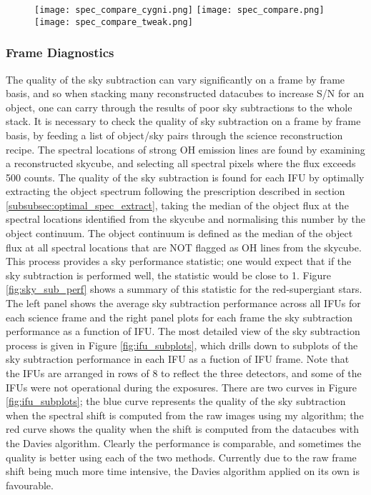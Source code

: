 \documentclass{literature}
\begin{document}
\begin{figure}[!htp]
\centering
\texttt{[image: spec\_compare\_cygni.png]}
\texttt{[image: spec\_compare.png]}
\texttt{[image: spec\_compare\_tweak.png]}
\caption{\footnotesize{\emph{}}}
\label{fig:p_cygni}
\end{figure}

\subsubsection{Frame Diagnostics}\label{frame_diagnostics}
The quality of the sky subtraction can vary significantly on a frame by frame basis, and so when stacking many reconstructed datacubes to increase S/N for an object, one can carry through the results of poor sky subtractions to the whole stack. It is necessary to check the quality of sky subtraction on a frame by frame basis, by feeding a list of object/sky pairs through the science reconstruction recipe. The spectral locations of strong OH emission lines are found by examining a reconstructed skycube, and selecting all spectral pixels where the flux exceeds 500 counts. The quality of the sky subtraction is found for each IFU by optimally extracting the object spectrum following the prescription described in section \ref{subsubsec:optimal_spec_extract}, taking the median of the object flux at the spectral locations identified from the skycube and normalising this number by the object continuum. The object continuum is defined as the median of the object flux at all spectral locations that are NOT flagged as OH lines from the skycube. This process provides a sky performance statistic; one would expect that if the sky subtraction is performed well, the statistic would be close to 1. Figure \ref{fig:sky_sub_perf} shows a summary of this statistic for the red-supergiant stars. The left panel shows the average sky subtraction performance across all IFUs for each science frame and the right panel plots for each frame the sky subtraction performance as a function of IFU. The most detailed view of the sky subtraction process is given in Figure \ref{fig:ifu_subplots}, which drills down to subplots of the sky subtraction performance in each IFU as a fuction of IFU frame. Note that the IFUs are arranged in rows of 8 to reflect the three detectors, and some of the IFUs were not operational during the exposures. There are two curves in Figure \ref{fig:ifu_subplots}; the blue curve represents the quality of the sky subtraction when the spectral shift is computed from the raw images using my algorithm; the red curve shows the quality when the shift is computed from the datacubes with the Davies algorithm. Clearly the performance is comparable, and sometimes the quality is better using each of the two methods. Currently due to the raw frame shift being much more time intensive, the Davies algorithm applied on its own is favourable. \\ 
\end{document}
